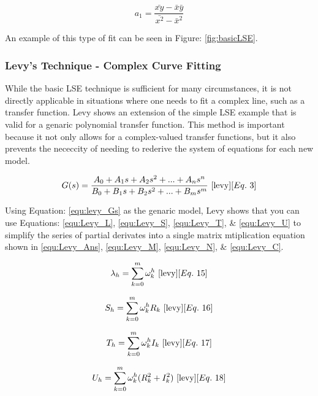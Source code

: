 \begin{equation}
\label{equ:LSE_sold}
a_1 = \frac{\bar{xy} - \bar{x}\bar{y}}{\bar{x^2} - \bar{x}^2}
\end{equation}

An example of this type of fit can be seen in Figure: \ref{fig:basicLSE}.


\subsubsection{Levy's Technique - Complex Curve Fitting}
While the basic LSE technique is sufficient for many circumstances, it is not directly applicable in situations where one needs to fit a complex line, such as a transfer function. Levy \cite{levy} shows an extension of the simple LSE example that is valid for a genaric polynomial transfer function. This method is important because it not only allows for a complex-valued transfer functions, but it also prevents the nececcity of needing to rederive the system of equations for each new model. 

\begin{equation}
\label{equ:levy_Gs}
G(s) = \frac{A_0 + A_1 s + A_2 s^2 + ... + A_n s^n}{B_0 + B_1 s + B_2 s^2 + ... + B_m s^m}
~\cite{levy}[Eq.~3]
\end{equation}

Using Equation: \eqref{equ:levy_Gs} as the genaric model, Levy shows that you can use Equations: \eqref{equ:Levy_L}, \eqref{equ:Levy_S}, \eqref{equ:Levy_T}, \& \eqref{equ:Levy_U} to simplify the series of partial derivates into a single matrix mtiplication equation shown in \eqref{equ:Levy_Ans}, \eqref{equ:Levy_M}, \eqref{equ:Levy_N}, \& \eqref{equ:Levy_C}.

\begin{equation}
\label{equ:Levy_L}
\lambda _h = \sum_{k=0}^{m} \omega _k ^h
~\cite{levy}[Eq.~15]
\end{equation}

\begin{equation}
\label{equ:Levy_S}
S_h = \sum_{k=0}^{m} \omega _k ^h R_k
~\cite{levy}[Eq.~16]
\end{equation}

\begin{equation}
\label{equ:Levy_T}
T_h = \sum_{k=0}^{m} \omega _k ^h I_k
~\cite{levy}[Eq.~17]
\end{equation}

\begin{equation}
\label{equ:Levy_U}
U_h = \sum_{k=0}^{m} \omega _k ^h (R_k ^2 + I_k ^2)
~\cite{levy}[Eq.~18]
\end{equation}

